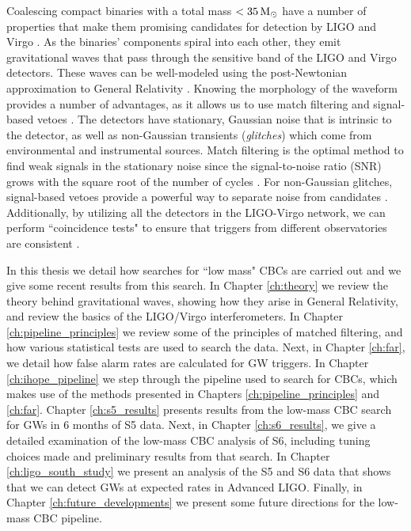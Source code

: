 Coalescing compact binaries with a total mass $< 35\,\mathrm{M_\odot}$ have a number of
properties that make them promising candidates for detection by LIGO and Virgo
\cite{LIGOS1iul,LIGOS2iul,LIGOS2macho,
LIGOS2bbh,LIGOS3S4all,Collaboration:2009tt,Abbott:2009qj,S5LowMassLV}.  As the
binaries' components spiral into each other, they emit gravitational waves that
pass through the sensitive band of the LIGO and Virgo detectors.  These waves
can be well-modeled using the post-Newtonian approximation to General
Relativity \cite{Blanchet:1996pi,Droz:1999qx,Blanchet:2002av,
Buonanno:2006ui,Boyle:2007ft,Hannam:2007ik, pan:024014,Boyle:2009dg}.  Knowing
the morphology of the waveform provides a number of advantages, as it allows us
to use match filtering and signal-based vetoes \cite{Brown,Allen:2004}.  The
detectors have stationary, Gaussian noise that is intrinsic to the detector, as
well as non-Gaussian transients (\emph{glitches}) which come from environmental
and instrumental sources.  Match filtering is the optimal method to find weak
signals in the stationary noise since the signal-to-noise ratio (SNR) grows
with the square root of the number of cycles
\cite{SathyaSchutz:livingReveiw:2009}. For non-Gaussian glitches, signal-based
vetoes provide a powerful way to separate noise from candidates
\cite{Allen:2004,Rodriguez:2007}.  Additionally, by utilizing all the detectors
in the LIGO-Virgo network, we can perform ``coincidence tests" to ensure that
triggers from different observatories are consistent \cite{Robinson:2008}.

In this thesis we detail how searches for ``low mass" \acp{CBC} are carried out
and we give some recent results from this search. In Chapter \ref{ch:theory} we
review the theory behind gravitational waves, showing how they arise in General
Relativity, and review the basics of the \ac{LIGO}/Virgo interferometers. In
Chapter \ref{ch:pipeline_principles} we review some of the principles of
matched filtering, and how various statistical tests are used to search the
data. Next, in Chapter \ref{ch:far}, we detail how false alarm rates are
calculated for \ac{GW} triggers. In Chapter \ref{ch:ihope_pipeline} we step
through the pipeline used to search for \acp{CBC}, which makes use of the
methods presented in Chapters \ref{ch:pipeline_principles} and \ref{ch:far}.
Chapter \ref{ch:s5_results} presents results from the low-mass \ac{CBC} search
for \acp{GW} in $6$ months of \ac{S5} data. Next, in Chapter
\ref{ch:s6_results}, we give a detailed examination of the low-mass \ac{CBC}
analysis of \ac{S6}, including tuning choices made and preliminary results from
that search. In Chapter \ref{ch:ligo_south_study} we present an analysis of the
\ac{S5} and \ac{S6} data that shows that we can detect \acp{GW} at expected
rates in Advanced \ac{LIGO}. Finally, in Chapter \ref{ch:future_developments}
we present some future directions for the low-mass \ac{CBC} pipeline.
